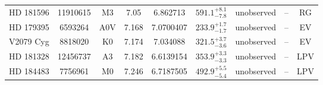 \begin{table*}
\begin{tabular}{ccccccccc}
HD 181596 & 11910615 & M3 & 7.05 & 6.862713 & $591.1^{+8.1}_{-7.8}$ & unobserved & -- & RG \\
HD 179395 & 6593264 & A0V & 7.168 & 7.0700407 & $233.9^{+1.7}_{-1.7}$ & unobserved & -- & EV \\
V2079 Cyg & 8818020 & K0 & 7.174 & 7.034088 & $321.5^{+3.7}_{-3.6}$ & unobserved & -- & EV \\
HD 181328 & 12456737 & A3 & 7.182 & 6.6139154 & $353.9^{+3.3}_{-3.3}$ & unobserved & -- & LPV \\
HD 184483 & 7756961 & M0 & 7.246 & 6.7187505 & $492.9^{+5.5}_{-5.4}$ & unobserved & -- & LPV \\
\hline
\end{tabular}
\end{table*}
